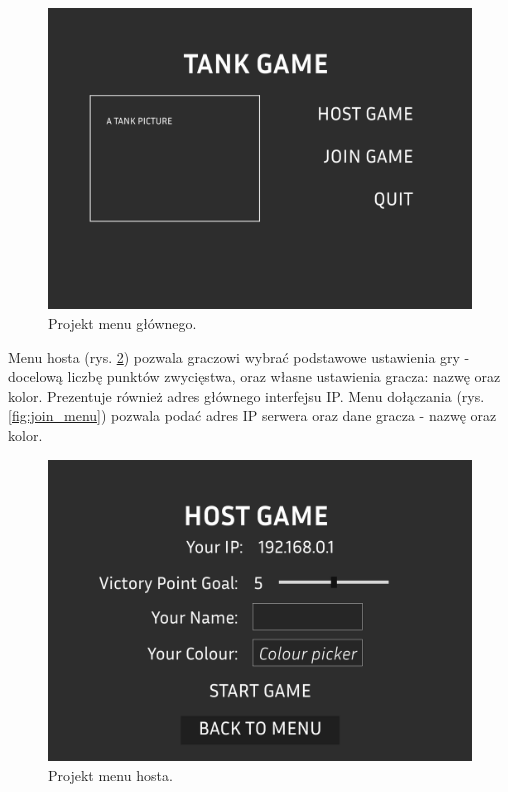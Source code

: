 \begin{figure}
    \centering
    \includegraphics[width=.8\linewidth]{Images/design/Main Menu.png}
    \caption{Projekt menu głównego.}
    \label{fig:main_menu}
\end{figure}

Menu hosta (rys. \ref{fig:host_menu}) pozwala graczowi wybrać podstawowe ustawienia gry - docelową liczbę punktów zwycięstwa, oraz własne ustawienia gracza: nazwę oraz kolor. Prezentuje również adres głównego interfejsu IP. Menu dołączania (rys. \ref{fig:join_menu}) pozwala podać adres IP serwera oraz dane gracza - nazwę oraz kolor.

\begin{figure}
    \centering
    \includegraphics[width=.8\linewidth]{Images/design/Host Menu.png}
    \caption{Projekt menu hosta.}
    \label{fig:host_menu}
\end{figure}

